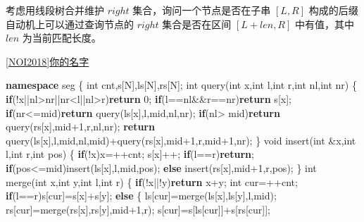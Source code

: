 \documentclass[
]{article}
\newenvironment{Shaded}{}{}
\newcommand{\ControlFlowTok}[1]{\textcolor[rgb]{0.00,0.44,0.13}{\textbf{#1}}}
\newcommand{\DataTypeTok}[1]{\textcolor[rgb]{0.56,0.13,0.00}{#1}}
\newcommand{\DecValTok}[1]{\textcolor[rgb]{0.25,0.63,0.44}{#1}}
\newcommand{\KeywordTok}[1]{\textcolor[rgb]{0.00,0.44,0.13}{\textbf{#1}}}
\newcommand{\NormalTok}[1]{#1}
\begin{document}
考虑用线段树合并维护 \(right\) 集合，询问一个节点是否在子串 \([L,R]\)
构成的后缀自动机上可以通过查询节点的 \(right\) 集合是否在区间
\([L+len,R]\) 中有值，其中 \(len\) 为当前匹配长度。

\href{https://www.luogu.com.cn/problem/P4770}{{[}NOI2018{]}你的名字}

\begin{Shaded}
\begin{Highlighting}[]
\KeywordTok{namespace}\NormalTok{ seg}
\NormalTok{\{}
    \DataTypeTok{int}\NormalTok{ cnt,s[N],ls[N],rs[N];}
    \DataTypeTok{int}\NormalTok{ query(}\DataTypeTok{int}\NormalTok{ x,}\DataTypeTok{int}\NormalTok{ l,}\DataTypeTok{int}\NormalTok{ r,}\DataTypeTok{int}\NormalTok{ nl,}\DataTypeTok{int}\NormalTok{ nr)}
\NormalTok{    \{}
        \ControlFlowTok{if}\NormalTok{(!x||nl\textgreater{}nr||nr\textless{}l||nl\textgreater{}r)}\ControlFlowTok{return} \DecValTok{0}\NormalTok{;}
        \ControlFlowTok{if}\NormalTok{(l==nl\&\&r==nr)}\ControlFlowTok{return}\NormalTok{ s[x];}
        \ControlFlowTok{if}\NormalTok{(nr\textless{}=mid)}\ControlFlowTok{return}\NormalTok{ query(ls[x],l,mid,nl,nr);}
        \ControlFlowTok{if}\NormalTok{(nl\textgreater{} mid)}\ControlFlowTok{return}\NormalTok{ query(rs[x],mid+}\DecValTok{1}\NormalTok{,r,nl,nr);}
        \ControlFlowTok{return}\NormalTok{ query(ls[x],l,mid,nl,mid)+query(rs[x],mid+}\DecValTok{1}\NormalTok{,r,mid+}\DecValTok{1}\NormalTok{,nr);}
\NormalTok{    \}}
    \DataTypeTok{void}\NormalTok{ insert(}\DataTypeTok{int}\NormalTok{ \&x,}\DataTypeTok{int}\NormalTok{ l,}\DataTypeTok{int}\NormalTok{ r,}\DataTypeTok{int}\NormalTok{ pos)}
\NormalTok{    \{}
        \ControlFlowTok{if}\NormalTok{(!x)x=++cnt; s[x]++; }\ControlFlowTok{if}\NormalTok{(l==r)}\ControlFlowTok{return}\NormalTok{;}
        \ControlFlowTok{if}\NormalTok{(pos\textless{}=mid)insert(ls[x],l,mid,pos);}
        \ControlFlowTok{else}\NormalTok{ insert(rs[x],mid+}\DecValTok{1}\NormalTok{,r,pos);}
\NormalTok{    \}}
    \DataTypeTok{int}\NormalTok{ merge(}\DataTypeTok{int}\NormalTok{ x,}\DataTypeTok{int}\NormalTok{ y,}\DataTypeTok{int}\NormalTok{ l,}\DataTypeTok{int}\NormalTok{ r)}
\NormalTok{    \{}
        \ControlFlowTok{if}\NormalTok{(!x||!y)}\ControlFlowTok{return}\NormalTok{ x+y; }\DataTypeTok{int}\NormalTok{ cur=++cnt;}
        \ControlFlowTok{if}\NormalTok{(l==r)s[cur]=s[x]+s[y];}
        \ControlFlowTok{else}
\NormalTok{        \{}
\NormalTok{            ls[cur]=merge(ls[x],ls[y],l,mid);}
\NormalTok{            rs[cur]=merge(rs[x],rs[y],mid+}\DecValTok{1}\NormalTok{,r);}
\NormalTok{            s[cur]=s[ls[cur]]+s[rs[cur]];}

\end{Highlighting}
\end{Shaded}
\end{document}
